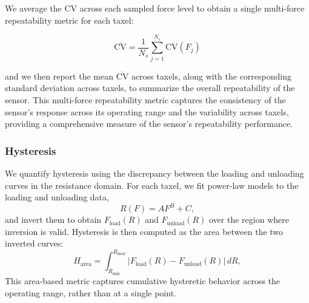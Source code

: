 We average the CV across each sampled force level to obtain a single multi-force repeatability metric for each taxel:

\begin{equation}
\overline{\mathrm{CV}} = \frac{1}{N_s} \sum_{j=1}^{N_s} \mathrm{CV}(F_j)
\end{equation}

and we then report the mean $\overline{\mathrm{CV}}$ across taxels, along with the corresponding standard deviation across taxels, to summarize the overall repeatability of the sensor. This multi-force repeatability metric captures the consistency of the sensor's response across its operating range and the variability across taxels, providing a comprehensive measure of the sensor's repeatability performance.



\subsubsection{Hysteresis}
We quantify hysteresis using the discrepancy between the loading and unloading curves in the resistance domain. For each taxel, we fit power-law models to the loading and unloading data,
\begin{equation}
R(F)=AF^B+C,
\end{equation}
and invert them to obtain $F_{\text{load}}(R)$ and $F_{\text{unload}}(R)$ over the region where inversion is valid. Hysteresis is then computed as the area between the two inverted curves:
\begin{equation}
H_{\text{area}} = \int_{R_{\text{min}}}^{R_{\text{max}}} \left|F_{\text{load}}(R) - F_{\text{unload}}(R)\right| \, dR,
\end{equation}
 This area-based metric captures cumulative hysteretic behavior across the operating range, rather than at a single point.

